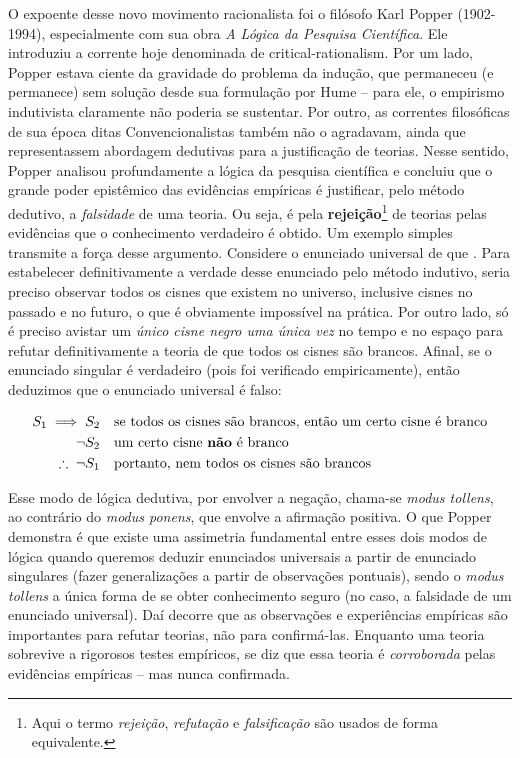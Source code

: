 \documentclass[./main.tex]{subfiles}
\begin{document}
\par O expoente desse novo movimento racionalista foi o filósofo Karl Popper (1902-1994), especialmente com sua obra \textit{A Lógica da Pesquisa Científica}. Ele introduziu a corrente hoje denominada de \gls{critical-rationalism}. Por um lado, Popper estava ciente da gravidade do problema da indução, que permaneceu (e permanece) sem solução desde sua formulação por Hume – para ele, o empirismo indutivista claramente não poderia se sustentar. Por outro, as correntes filosóficas de sua época ditas Convencionalistas também não o agradavam, ainda que representassem abordagem dedutivas para a justificação de teorias. Nesse sentido, Popper analisou profundamente a lógica da pesquisa científica e concluiu que o grande poder epistêmico das evidências empíricas é justificar, pelo método dedutivo, a \textit{falsidade} de uma teoria. Ou seja, é pela \textbf{rejeição}\footnote{Aqui o termo \textit{rejeição}, \textit{refutação} e \textit{falsificação} são usados de forma equivalente.} de teorias pelas evidências que o conhecimento verdadeiro é obtido. Um exemplo simples transmite a força desse argumento. Considere o enunciado universal de que . Para estabelecer definitivamente a verdade desse enunciado pelo método indutivo, seria preciso observar todos os cisnes que existem no universo, inclusive cisnes no passado e no futuro, o que é obviamente impossível na prática. Por outro lado, só é preciso avistar um \textit{único cisne negro uma única vez} no tempo e no espaço para refutar definitivamente a teoria de que todos os cisnes são brancos. Afinal, se o enunciado singular  é verdadeiro (pois foi verificado empiricamente), então deduzimos que o enunciado universal  é falso:
\begin{linenomath*}
    \begin{align*}
        S_1 \implies S_2 & \quad \textnormal{se todos os cisnes são brancos, então um certo cisne é branco} \\
        \neg S_2 & \quad \textnormal{um certo cisne \textbf{não} é branco}\\
        \therefore\;\neg S_1 & \quad \textnormal{portanto, nem todos os cisnes são brancos}
    \end{align*}
\end{linenomath*}
Esse modo de lógica dedutiva, por envolver a negação, chama-se \textit{modus tollens}, ao contrário do \textit{modus ponens}, que envolve a afirmação positiva. O que Popper demonstra é que existe uma assimetria fundamental entre esses dois modos de lógica quando queremos deduzir enunciados universais a partir de enunciado singulares (fazer generalizações a partir de observações pontuais), sendo o \textit{modus tollens} a única forma de se obter conhecimento seguro (no caso, a falsidade de um enunciado universal). Daí decorre que as observações e experiências empíricas são importantes para refutar teorias, não para confirmá-las. Enquanto uma teoria sobrevive a rigorosos testes empíricos, se diz que essa teoria é \textit{corroborada} pelas evidências empíricas – mas nunca confirmada.
\end{document}
